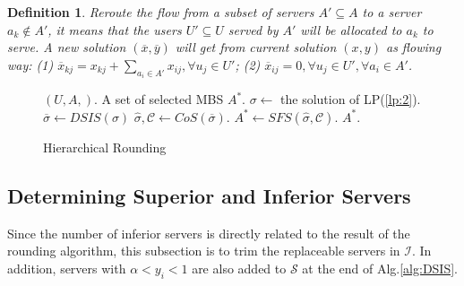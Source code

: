 \documentclass[11pt,a4paper]{article}
\newtheorem{definition}[theorem]{Definition}
\begin{document}
\begin{definition}
	Reroute the flow from a subset of servers $A' \subseteq A$ to a server $a_k \notin A'$, it means that the users $U' \subseteq U$ served by $A'$ will be allocated to $a_k$ to serve. A new solution $(\overline x, \overline y)$ will get from current solution $(x, y)$ as flowing way: (1) $\overline{x}_{kj} = {x}_{kj} + \sum\nolimits_{{a_i} \in A'} {{{x}_{ij}}}, \forall u_j \in U' $; (2) $\overline x_{ij} = 0, \forall u_j\in U', \forall a_i \in A'$.
	
\end{definition}
\begin{figure}[!t]
	\renewcommand{\algorithmicrequire}{\textbf{Input:}}
	\renewcommand{\algorithmicensure}{\textbf{Output:}}
	\begin{algorithm}[H]
		\caption{Hierarchical Rounding}
		\begin{algorithmic}[1]\label{alg:HR}
			\REQUIRE $(U, A, )$. 
			\ENSURE A set of selected MBS $A^*$.
			\STATE $\sigma \leftarrow $ the solution of LP(\ref{lp:2}).
			\STATE $\overline{\sigma} \leftarrow DSIS(\sigma)$
			\STATE $\widehat{\sigma}, \mathcal{C} \leftarrow CoS(\overline{\sigma})$.
			\STATE $A^* \leftarrow SFS(\widehat{\sigma}, \mathcal{C})$.
			\RETURN $A^*$.
		\end{algorithmic}
	\end{algorithm}
\end{figure}


\subsection{Determining Superior and Inferior Servers}
Since the number of inferior servers is directly related to the result of the rounding algorithm, this subsection is to trim the replaceable servers in $\mathcal{I}$. In addition, servers with $\alpha < y_i < 1$ are also added to $\mathcal{S}$ at the end of Alg.\ref{alg:DSIS}.
\end{document}
